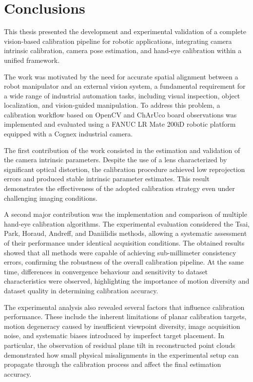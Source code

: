 \chapter{Conclusions}
\label{chap:conclusions}

This thesis presented the development and experimental validation of a complete vision-based calibration pipeline for robotic applications, integrating camera intrinsic calibration, camera pose estimation, and hand-eye calibration within a unified framework.

The work was motivated by the need for accurate spatial alignment between a robot manipulator and an external vision system, a fundamental requirement for a wide range of industrial automation tasks, including visual inspection, object localization, and vision-guided manipulation. To address this problem, a calibration workflow based on OpenCV and ChArUco board observations was implemented and evaluated using a FANUC LR Mate 200iD robotic platform equipped with a Cognex industrial camera.

The first contribution of the work consisted in the estimation and validation of the camera intrinsic parameters. Despite the use of a lens characterized by significant optical distortion, the calibration procedure achieved low reprojection errors and produced stable intrinsic parameter estimates. This result demonstrates the effectiveness of the adopted calibration strategy even under challenging imaging conditions.

A second major contribution was the implementation and comparison of multiple hand-eye calibration algorithms. The experimental evaluation considered the Tsai, Park, Horaud, Andreff, and Daniilidis methods, allowing a systematic assessment of their performance under identical acquisition conditions. The obtained results showed that all methods were capable of achieving sub-millimeter consistency errors, confirming the robustness of the overall calibration pipeline. At the same time, differences in convergence behaviour and sensitivity to dataset characteristics were observed, highlighting the importance of motion diversity and dataset quality in determining calibration accuracy.


The experimental analysis also revealed several factors that influence calibration performance. These include the inherent limitations of planar calibration targets, motion degeneracy caused by insufficient viewpoint diversity, image acquisition noise, and systematic biases introduced by imperfect target placement. In particular, the observation of residual plane tilt in reconstructed point clouds demonstrated how small physical misalignments in the experimental setup can propagate through the calibration process and affect the final estimation accuracy.

